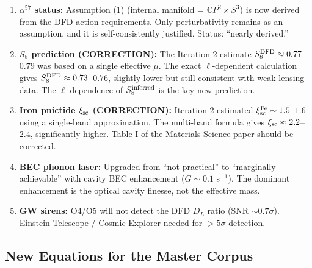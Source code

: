\documentclass[11pt]{article}
\begin{document}
\begin{enumerate}
\item \textbf{$\alpha^{57}$ status:} Assumption (1) (internal manifold = $\mathbb{C}P^2\times S^3$) is now derived from the DFD action requirements. Only perturbativity remains as an assumption, and it is self-consistently justified. Status: ``nearly derived.''

\item \textbf{$S_8$ prediction (CORRECTION):} The Iteration 2 estimate $S_8^{\rm DFD} \approx 0.77$--$0.79$ was based on a single effective $\mu$. The exact $\ell$-dependent calculation gives $S_8^{\rm DFD} \approx 0.73$--$0.76$, slightly lower but still consistent with weak lensing data. The $\ell$-dependence of $S_8^{\rm inferred}$ is the key new prediction.

\item \textbf{Iron pnictide $\xi_{\rm sc}$ (CORRECTION):} Iteration 2 estimated $\xi_{\rm sc}^{\rm Fe} \sim 1.5$--$1.6$ using a single-band approximation. The multi-band formula gives $\xi_{\rm sc} \approx 2.2$--$2.4$, significantly higher. Table I of the Materials Science paper should be corrected.

\item \textbf{BEC phonon laser:} Upgraded from ``not practical'' to ``marginally achievable'' with cavity BEC enhancement ($G \sim 0.1$ s$^{-1}$). The dominant enhancement is the optical cavity finesse, not the effective mass.

\item \textbf{GW sirens:} O4/O5 will not detect the DFD $D_L$ ratio (SNR $\sim 0.7\sigma$). Einstein Telescope / Cosmic Explorer needed for $>5\sigma$ detection.
\end{enumerate}

\subsection*{New Equations for the Master Corpus}
\end{document}
